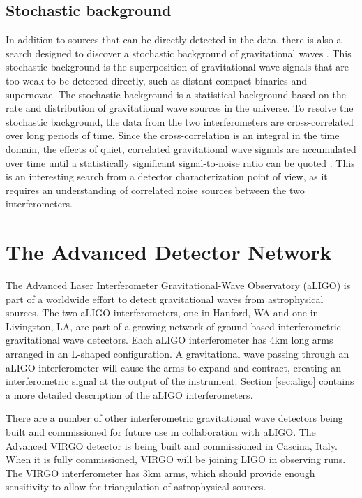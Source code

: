 \subsection{Stochastic background}

In addition to sources that can be directly detected in the data, there is 
also a search designed to discover a stochastic background of gravitational waves
 \cite{Collaboration:S4Stochastic,GW150914-STOCHASTIC}. 
This stochastic background is the superposition of gravitational wave signals that 
are too weak to be detected directly, such as distant compact binaries and 
supernovae. The stochastic background is a statistical background based on the 
rate and distribution of gravitational wave sources in the universe. To resolve 
the stochastic background, the data from the two interferometers are 
cross-correlated over long periods of time. Since the cross-correlation 
is an integral in the time domain, the effects of quiet, correlated 
gravitational wave signals are accumulated over time until a statistically 
significant signal-to-noise ratio can be quoted \cite{Allen1999Stoch}. 
This is an interesting search from a detector characterization point of view, 
as it requires an understanding of correlated noise sources between the two 
interferometers. 

\section{The Advanced Detector Network}

The Advanced Laser Interferometer Gravitational-Wave Observatory (aLIGO) is 
part of a worldwide effort to detect gravitational waves from astrophysical 
sources. The two aLIGO interferometers, one in Hanford, WA and one in 
Livingston, LA, are part of a growing network of ground-based interferometric 
gravitational wave detectors. Each aLIGO interferometer has 4km long arms 
arranged in an L-shaped configuration. A gravitational wave passing through 
an aLIGO interferometer will cause the arms to expand and contract, 
creating an interferometric signal at the output of the instrument. 
Section \ref{sec:aligo} contains a more detailed description of the aLIGO 
interferometers. 

There are a number of other interferometric gravitational wave detectors 
being built and commissioned for future use in collaboration with aLIGO.
The Advanced VIRGO detector is being built and commissioned in Cascina, Italy. 
When it is fully commissioned, VIRGO will be joining LIGO in observing runs. 
The VIRGO interferometer has 3km arms, which should provide enough 
sensitivity to allow for triangulation of astrophysical sources.


